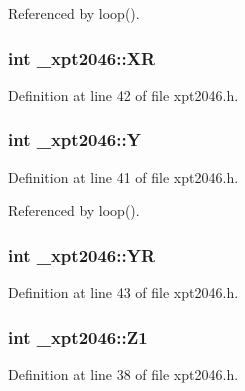 Referenced by loop().

\subsubsection[{\texorpdfstring{XR}{XR}}]{\setlength{\rightskip}{0pt plus 5cm}int \+\_\+xpt2046\+::\+XR}\hypertarget{struct__xpt2046_a84ee789fdab925bb14ea18705bb47bdc}{}\label{struct__xpt2046_a84ee789fdab925bb14ea18705bb47bdc}


Definition at line 42 of file xpt2046.\+h.

\subsubsection[{\texorpdfstring{Y}{Y}}]{\setlength{\rightskip}{0pt plus 5cm}int \+\_\+xpt2046\+::Y}\hypertarget{struct__xpt2046_a246ecf319439bdb35f405238c93a0868}{}\label{struct__xpt2046_a246ecf319439bdb35f405238c93a0868}


Definition at line 41 of file xpt2046.\+h.



Referenced by loop().

\subsubsection[{\texorpdfstring{YR}{YR}}]{\setlength{\rightskip}{0pt plus 5cm}int \+\_\+xpt2046\+::\+YR}\hypertarget{struct__xpt2046_a2c03aa55cd5446e4d44c9de8c1c3ca26}{}\label{struct__xpt2046_a2c03aa55cd5446e4d44c9de8c1c3ca26}


Definition at line 43 of file xpt2046.\+h.

\subsubsection[{\texorpdfstring{Z1}{Z1}}]{\setlength{\rightskip}{0pt plus 5cm}int \+\_\+xpt2046\+::\+Z1}\hypertarget{struct__xpt2046_a3d4ffe11b35c91513c5c90b0b1d59f44}{}\label{struct__xpt2046_a3d4ffe11b35c91513c5c90b0b1d59f44}


Definition at line 38 of file xpt2046.\+h.

